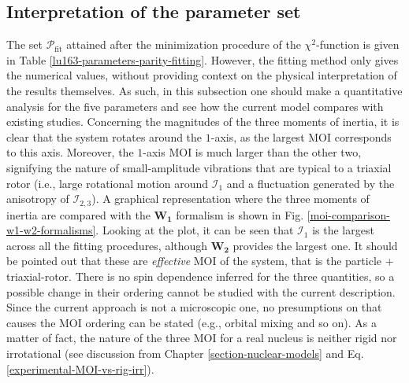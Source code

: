 \subsection{Interpretation of the parameter set}

The set $\mathcal{P}_\text{fit}$ attained after the minimization procedure of the $\chi^2$-function is given in Table \ref{lu163-parameters-parity-fitting}. However, the fitting method only gives the numerical values, without providing context on the physical interpretation of the results themselves. As such, in this subsection one should make a quantitative analysis for the five parameters and see how the current model compares with existing studies. Concerning the magnitudes of the three moments of inertia, it is clear that the system rotates around the $1$-axis, as the largest MOI corresponds to this axis. Moreover, the $1$-axis MOI is much larger than the other two, signifying the nature of small-amplitude vibrations that are typical to a triaxial rotor (i.e., large rotational motion around $\mathcal{I}_1$ and a fluctuation generated by the anisotropy of $\mathcal{I}_{2,3}$). A graphical representation where the three moments of inertia are compared with the $\mathbf{W_1}$ formalism is shown in Fig. \ref{moi-comparison-w1-w2-formalisms}. Looking at the plot, it can be seen that $\mathcal{I}_1$ is the largest across all the fitting procedures, although $\mathbf{W_2}$ provides the largest one. It should be pointed out that these are \emph{effective} MOI of the system, that is the particle + triaxial-rotor. There is no spin dependence inferred for the three quantities, so a possible change in their ordering cannot be studied with the current description. Since the current approach is not a microscopic one, no presumptions on that causes the MOI ordering can be stated (e.g., orbital mixing and so on). As a matter of fact, the nature of the three MOI for a real nucleus is neither rigid nor irrotational (see discussion from Chapter \ref{section-nuclear-models} and Eq. \ref{experimental-MOI-vs-rig-irr}).

